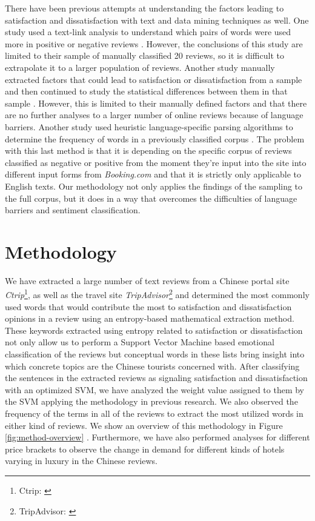 \documentclass[review]{elsarticle}
\begin{document}
There have been previous attempts at understanding the factors leading to satisfaction and dissatisfaction with text and data mining techniques as well. One study used a text-link analysis to understand which pairs of words were used more in positive or negative reviews \cite[][]{berezina2016}. However, the conclusions of this study are limited to their sample of manually classified 20 reviews, so it is difficult to extrapolate it to a larger population of reviews. Another study manually extracted factors that could lead to satisfaction or dissatisfaction from a sample and then continued to study the statistical differences between them in that sample \cite[][]{zhou2014}. However, this is limited to their manually defined factors and that there are no further analyses to a larger number of online reviews because of language barriers. Another study used heuristic language-specific parsing algorithms to determine the frequency of words in a previously classified corpus \cite[][]{xu2016}. The problem with this last method is that it is depending on the specific corpus of reviews classified as negative or positive from the moment they're input into the site into different input forms from \textit{Booking.com} and that it is strictly only applicable to English texts. Our methodology not only applies the findings of the sampling to the full corpus, but it does in a way that overcomes the difficulties of language barriers and sentiment classification.

\section{Methodology}\label{method}

We have extracted a large number of text reviews from a Chinese portal site \textit{Ctrip}\footnote{\label{ctrip}Ctrip: \href {www.ctrip.com/}{}}, as well as the travel site \textit{TripAdvisor}\footnote{\label{tripadvisor}TripAdvisor: \href {www.tripadvisor.com/}{}} and determined the most commonly used words that would contribute the most to satisfaction and dissatisfaction opinions in a review using an entropy-based mathematical extraction method. These keywords extracted using entropy related to satisfaction or dissatisfaction not only allow us to perform a Support Vector Machine based emotional classification of the reviews but conceptual words in these lists bring insight into which concrete topics are the Chinese tourists concerned with. After classifying the sentences in the extracted reviews as signaling satisfaction and dissatisfaction with an optimized SVM, we have analyzed the weight value assigned to them by the SVM applying the methodology in previous research. We also observed the frequency of the terms in all of the reviews to extract the most utilized words in either kind of reviews. We show an overview of this methodology in Figure \ref{fig:method-overview} \cite[][]{Aleman2018ICAROB}. Furthermore, we have also performed analyses for different price brackets to observe the change in demand for different kinds of hotels varying in luxury in the Chinese reviews.
\end{document}
